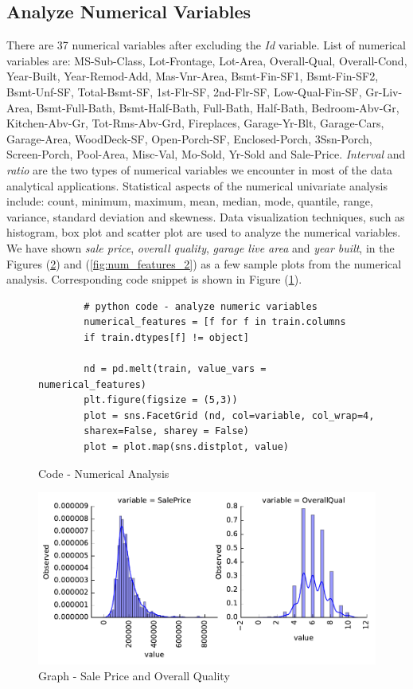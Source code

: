 \documentclass[sigconf]{acmart}
\begin{document}
	\subsection{Analyze Numerical Variables}
	There are 37 numerical variables after excluding the {\em Id} variable. List of numerical variables are: MS-Sub-Class, Lot-Frontage, Lot-Area, Overall-Qual, Overall-Cond, Year-Built, Year-Remod-Add, Mas-Vnr-Area, Bsmt-Fin-SF1, Bsmt-Fin-SF2, Bsmt-Unf-SF, Total-Bsmt-SF, 1st-Flr-SF, 2nd-Flr-SF, Low-Qual-Fin-SF, Gr-Liv-Area, Bsmt-Full-Bath, Bsmt-Half-Bath, Full-Bath, Half-Bath, Bedroom-Abv-Gr, Kitchen-Abv-Gr, Tot-Rms-Abv-Grd, Fireplaces, Garage-Yr-Blt, Garage-Cars, Garage-Area, WoodDeck-SF, Open-Porch-SF, Enclosed-Porch, 3Ssn-Porch, Screen-Porch, Pool-Area, Misc-Val, Mo-Sold, Yr-Sold and Sale-Price. {\em Interval} and {\em ratio} are the two types of numerical variables we encounter in most of the data analytical applications. Statistical aspects of the numerical univariate analysis include: count, minimum, maximum, mean, median, mode, quantile, range, variance, standard deviation and skewness. Data visualization techniques, such as histogram, box plot and scatter plot are used to analyze the numerical variables. We have shown {\em sale price}, {\em overall quality}, {\em garage live area} and {\em year built}, in the Figures (\ref{fig:num-feature-1}) and (\ref{fig:num_features_2}) as a few sample plots from the numerical analysis. Corresponding code snippet is shown in Figure (\ref{c:analyze-numeric}).
	
	\begin{figure}[htb]
		\begin{verbatim}
		# python code - analyze numeric variables
		numerical_features = [f for f in train.columns 
		if train.dtypes[f] != object]
		
		nd = pd.melt(train, value_vars = numerical_features)	
		plt.figure(figsize = (5,3))
		plot = sns.FacetGrid (nd, col=variable, col_wrap=4,
		sharex=False, sharey = False)
		plot = plot.map(sns.distplot, value)				
		\end{verbatim}
		\caption{Code - Numerical Analysis}\label{c:analyze-numeric}
	\end{figure}
	
	
	\begin{figure}[htb]
		\centering
		\includegraphics[width=1.0\columnwidth]{images/num_features_1}	
		\caption{Graph - Sale Price and Overall Quality}\label{fig:num-feature-1}		
	\end{figure}
	
\end{document}
